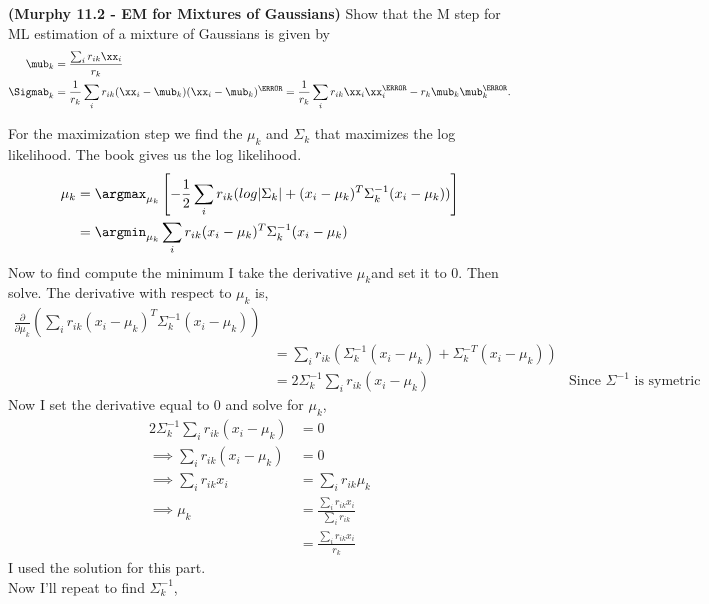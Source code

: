 \documentclass[12pt,letterpaper,boxed]{hmcpset}
\begin{document}
\begin{problem}[1]
\textbf{(Murphy 11.2 - EM for Mixtures of Gaussians)} Show that the M step for ML
estimation of a mixture of Gaussians is given by
\begin{align*}
    \mub_k &= \frac{\sum_i r_{ik}\xx_i}{r_k}\\
    \Sigmab_k &= \frac{1}{r_k}\sum_i r_{ik}(\xx_i - \mub_k)(\xx_i - \mub_k)^\T = \frac{1}{r_k}\sum_i r_{ik}\xx_i\xx_i^\T - r_k\mub_k\mub_k^\T.
\end{align*}
\end{problem}
\begin{solution}
  For the maximization step we find the $\mu_k$ and $\Sigma_k$ that maximizes
  the log likelihood. The book gives us the log likelihood.
  \begin{align*}
    \mu_k &= \argmax_{\mu_k} \left[ -\frac{1}{2} \sum_i r_{ik} (log |\Sigma_k| + (x_i - \mu_k)^T \Sigma_k^{-1}(x_i - \mu_k))  \right] \\
    &= \argmin_{\mu_k} \sum_i r_{ik} (x_i - \mu_k)^T \Sigma_k^{-1}(x_i - \mu_k) \\
  \end{align*}
  Now to find compute the minimum I take the derivative $\mu_k$and set it to 0. Then
  solve. The derivative with respect to $\mu_k$ is,
  \begin{align*}
    \frac{\partial}{\partial \mu_k} \left( \sum_i r_{ik} (x_i - \mu_k)^T \Sigma_k^{-1}(x_i - \mu_k) \right) \\
    &= \sum_i r_{ik} \left( \Sigma_k^{-1}(x_i -\mu_k )  + \Sigma_k^{-T} (x_i - \mu_k) \right) \\
    &= 2 \Sigma_k^{-1} \sum_i r_{ik} (x_i -\mu_k ) & \text{Since $\Sigma^{-1}$ is symetric }
  \end{align*}
  Now I set the derivative equal to $0$ and solve for $\mu_k$,
  \begin{align*}
    2 \Sigma_k^{-1} \sum_i r_{ik} (x_i -\mu_k ) &= 0 \\
    \implies \sum_i r_{ik} (x_i  -\mu_k ) &= 0 \\
    \implies \sum_i r_{ik} x_i &= \sum_i r_{ik} \mu_k \\
    \implies \mu_k &= \frac{\sum_i r_{ik} x_i}{\sum_i r_{ik}} \\
    &= \boxed{\frac{\sum_i r_{ik} x_i}{r_k}}
  \end{align*}
  I used the solution for this part. \\
  Now I'll repeat to find $\Sigma_k^{-1}$,
  \begin{align*}

\end{align*}
\end{solution}
\end{document}
